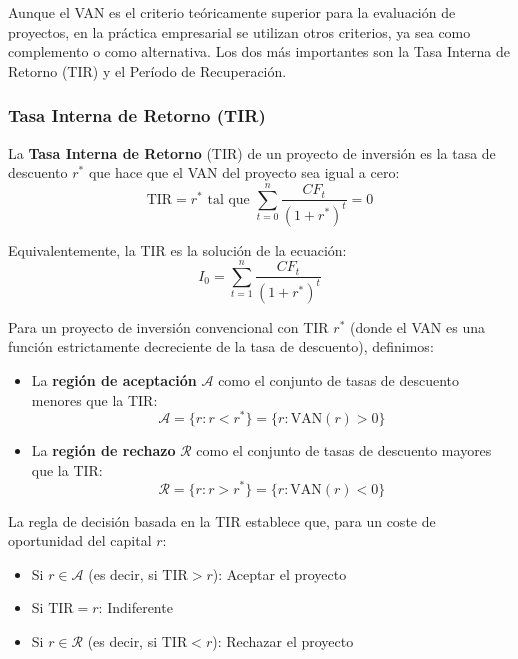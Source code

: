 Aunque el VAN es el criterio teóricamente superior para la evaluación de proyectos, en la práctica empresarial se utilizan otros criterios, ya sea como complemento o como alternativa. Los dos más importantes son la Tasa Interna de Retorno (TIR) y el Período de Recuperación.

\subsubsection{Tasa Interna de Retorno (TIR)}

\begin{definicion}
La \textbf{Tasa Interna de Retorno} (TIR) de un proyecto de inversión es la tasa de descuento $r^*$ que hace que el VAN del proyecto sea igual a cero:
\begin{equation}
\text{TIR} = r^* \text{ tal que } \sum_{t=0}^{n} \frac{CF_t}{(1+r^*)^t} = 0
\end{equation}
\end{definicion}

Equivalentemente, la TIR es la solución de la ecuación:
\begin{equation}
I_0 = \sum_{t=1}^{n} \frac{CF_t}{(1+r^*)^t}
\end{equation}

\begin{center}
    
\end{center}

\begin{teorema}
Para un proyecto de inversión convencional con TIR $r^*$ (donde el VAN es una función estrictamente decreciente de la tasa de descuento), definimos:
\begin{itemize}
\item La \textbf{región de aceptación} $\mathcal{A}$ como el conjunto de tasas de descuento menores que la TIR:
$$\mathcal{A} = \{r : r < r^*\} = \{r : \text{VAN}(r) > 0\}$$
\item La \textbf{región de rechazo} $\mathcal{R}$ como el conjunto de tasas de descuento mayores que la TIR:
$$\mathcal{R} = \{r : r > r^*\} = \{r : \text{VAN}(r) < 0\}$$
\end{itemize}

La regla de decisión basada en la TIR establece que, para un coste de oportunidad del capital $r$:
\begin{itemize}
\item Si $r \in \mathcal{A}$ (es decir, si $\text{TIR} > r$): Aceptar el proyecto
\item Si $\text{TIR} = r$: Indiferente
\item Si $r \in \mathcal{R}$ (es decir, si $\text{TIR} < r$): Rechazar el proyecto
\end{itemize}
\end{teorema}

